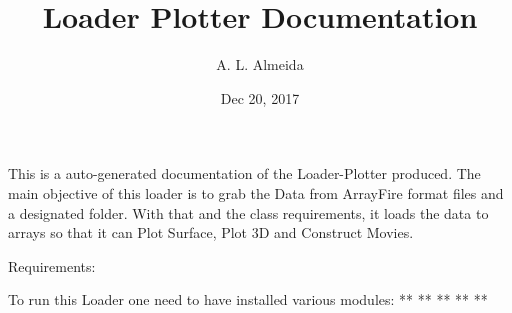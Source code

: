 \documentclass[letterpaper,10pt,english]{sphinxmanual}
\title{Loader Plotter Documentation}
\date{Dec 20, 2017}
\author{A. L. Almeida}
\begin{document}
\maketitle


This is a auto-generated documentation of the Loader-Plotter produced.
The main objective of this loader is to grab the Data from ArrayFire format files and a designated folder. With that and the class requirements, it loads the data to  arrays so that it can Plot Surface, Plot 3D and Construct Movies.

Requirements:

To run this Loader one need to have installed various modules:
** 
** 
** 
** 
** 
\end{document}
